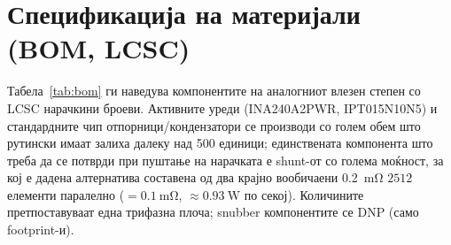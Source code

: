 \documentclass[journal,onecolumn,11pt]{IEEEtran}
\begin{document}
\section{Спецификација на материјали (BOM, LCSC)}\label{sec:bom}
Табела~\ref{tab:bom} ги наведува компонентите на аналогниот влезен степен со LCSC нарачкини броеви.
Активните уреди (INA240A2PWR, IPT015N10N5) и стандардните чип отпорници/кондензатори се производи со
голем обем што рутински имаат залиха далеку над \num{500} единици; единствената компонента што треба да
се потврди при пуштање на нарачката е shunt-от со голема моќност, за кој е дадена алтернатива составена
од два крајно вообичаени \SI{0.2}{\milli\ohm} \(2512\) елементи паралелно (\(=\SI{0.1}{\milli\ohm}\),
\(\approx\SI{0.93}{\watt}\) по секој). Количините претпоставуваат една трифазна плоча; snubber
компонентите се DNP (само footprint-и).
\end{document}
